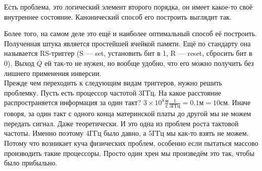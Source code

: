 \documentclass{article}
\begin{document}
    Есть проблема, это логический элемент второго порядка, он имеет какое-то своё внутреннее состояние. Канонический способ его построить выглядит так.
    \begin{center}\end{center}
    Более того, на самом деле это ещё и наиболее оптимальный способ её построить. Полученная штука является простейшей ячейкой памяти. Ещё по стандарту она называется RS-триггер (S --- set, установить бит в 1, R --- reset, сбросить бит в 0). Выход $\overline Q$ ей так-то не нужен, но вообще удобно, что его можно получить без лишнего применения инверсии.\\
    Прежде чем переходить к следующим видам триггеров, нужно решить проблемку. Пусть есть процессор частотой 3ГГц. На какое расстояние распространяется информация за один такт? $3\times10^8\frac{\text{м}}{\text{с}}\frac1{3\text{ГГц}}=0.1\text{м}=10\text{см}$. Иначе говоря, за один такт с одного конца материнской платы до другой мы не можем передать сигнал. Даже теоретически. И это одна из проблем роста тактовой частоты. Именно поэтому 4ГГц было давно, а 5ГГц мы как-то взять не можем. Потому что возникает куча физических проблем, особенно если пытаться массово производить такие процессоры. Просто один хрен мы произведём это так, чтобы было прибыльно.\\
\end{document}
